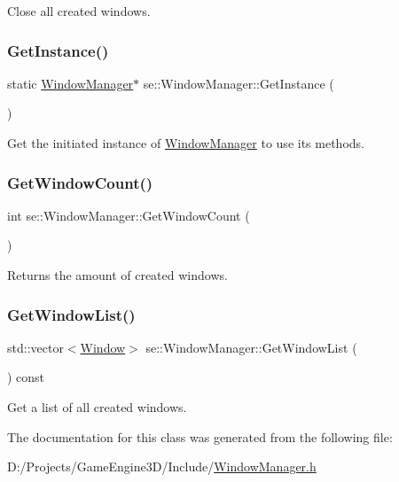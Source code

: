 Close all created windows. \mbox{\label{classse_1_1_window_manager_a95991bd0d710a1e7b05d1faef2581633}} 
\subsubsection{\texorpdfstring{Get\+Instance()}{GetInstance()}}
{\footnotesize\ttfamily static \mbox{\hyperlink{classse_1_1_window_manager}{Window\+Manager}}$\ast$ se\+::\+Window\+Manager\+::\+Get\+Instance (\begin{DoxyParamCaption}{ }\end{DoxyParamCaption})\hspace{0.3cm}{\ttfamily [static]}}

Get the initiated instance of \mbox{\hyperlink{classse_1_1_window_manager}{Window\+Manager}} to use its methods. \mbox{\label{classse_1_1_window_manager_aec9f7b4a351181abd1a9963a33494614}} 
\subsubsection{\texorpdfstring{Get\+Window\+Count()}{GetWindowCount()}}
{\footnotesize\ttfamily int se\+::\+Window\+Manager\+::\+Get\+Window\+Count (\begin{DoxyParamCaption}{ }\end{DoxyParamCaption})}

Returns the amount of created windows. \mbox{\label{classse_1_1_window_manager_aa4f9a776e1d8a44f80fea722b7cdb36c}} 
\subsubsection{\texorpdfstring{Get\+Window\+List()}{GetWindowList()}}
{\footnotesize\ttfamily std\+::vector$<$\mbox{\hyperlink{classse_1_1_window}{Window}}$>$ se\+::\+Window\+Manager\+::\+Get\+Window\+List (\begin{DoxyParamCaption}{ }\end{DoxyParamCaption}) const}

Get a list of all created windows. 

The documentation for this class was generated from the following file\+:\begin{DoxyCompactItemize}
\item 
D\+:/\+Projects/\+Game\+Engine3\+D/\+Include/\mbox{\hyperlink{_window_manager_8h}{Window\+Manager.\+h}}\end{DoxyCompactItemize}
